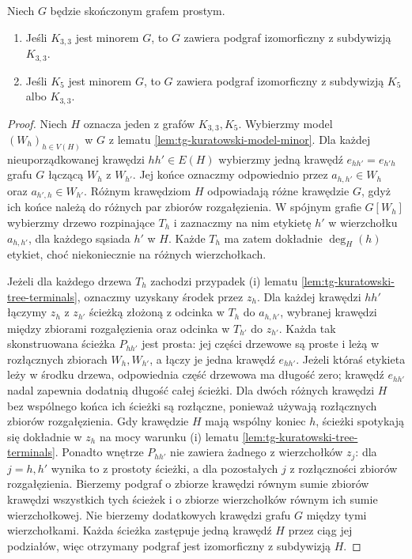 \begin{lemat}
\label{lem:tg-kuratowski-minor-to-subdivision}
Niech $G$ będzie skończonym grafem prostym.
\begin{enumerate}[label=(\roman*)]
\item Jeśli $K_{3,3}$ jest minorem $G$,
to $G$ zawiera podgraf izomorficzny
z subdywizją $K_{3,3}$.
\item Jeśli $K_5$ jest minorem $G$,
to $G$ zawiera podgraf izomorficzny
z subdywizją $K_5$ albo $K_{3,3}$.
\end{enumerate}
\end{lemat}
\begin{proof}
Niech $H$ oznacza jeden z grafów
$K_{3,3},K_5$. Wybierzmy model
$(W_h)_{h\in V(H)}$ w $G$
z lematu \ref{lem:tg-kuratowski-model-minor}.
Dla każdej nieuporządkowanej krawędzi $hh'\in E(H)$
wybierzmy jedną krawędź $e_{hh'}=e_{h'h}$ grafu $G$
łączącą $W_h$ z $W_{h'}$. Jej końce oznaczmy
odpowiednio przez $a_{h,h'}\in W_h$ oraz
$a_{h',h}\in W_{h'}$. Różnym krawędziom $H$
odpowiadają różne krawędzie $G$, gdyż ich końce
należą do różnych par zbiorów rozgałęzienia.
W spójnym grafie $G[W_h]$
wybierzmy drzewo rozpinające $T_h$
i zaznaczmy na nim etykietę $h'$
w wierzchołku $a_{h,h'}$,
dla każdego sąsiada $h'$ w $H$.
Każde $T_h$ ma zatem dokładnie
$\deg_H(h)$ etykiet, choć
niekoniecznie na różnych
wierzchołkach.

Jeżeli dla każdego drzewa $T_h$
zachodzi przypadek (i) lematu
\ref{lem:tg-kuratowski-tree-terminals},
oznaczmy uzyskany środek
przez $z_h$. Dla każdej
krawędzi $hh'$ łączymy
$z_h$ z $z_{h'}$ ścieżką
złożoną z odcinka w $T_h$
do $a_{h,h'}$, wybranej
krawędzi między zbiorami
rozgałęzienia oraz odcinka
w $T_{h'}$ do $z_{h'}$.
Każda tak skonstruowana ścieżka $P_{hh'}$ jest
prosta: jej części drzewowe są proste i leżą
w rozłącznych zbiorach $W_h,W_{h'}$, a łączy je
jedna krawędź $e_{hh'}$. Jeżeli któraś etykieta
leży w środku drzewa, odpowiednia część drzewowa
ma długość zero; krawędź $e_{hh'}$ nadal zapewnia
dodatnią długość całej ścieżki.
Dla dwóch różnych krawędzi $H$ bez wspólnego końca
ich ścieżki są rozłączne, ponieważ używają
rozłącznych zbiorów rozgałęzienia. Gdy krawędzie
$H$ mają wspólny koniec $h$, ścieżki spotykają się
dokładnie w $z_h$ na mocy warunku (i) lematu
\ref{lem:tg-kuratowski-tree-terminals}.
Ponadto wnętrze $P_{hh'}$ nie zawiera żadnego
z wierzchołków $z_j$: dla $j=h,h'$ wynika to
z prostoty ścieżki, a dla pozostałych $j$
z rozłączności zbiorów rozgałęzienia.
Bierzemy podgraf o zbiorze krawędzi równym sumie
zbiorów krawędzi wszystkich tych ścieżek i o zbiorze
wierzchołków równym ich sumie wierzchołkowej.
Nie bierzemy dodatkowych krawędzi grafu $G$
między tymi wierzchołkami. Każda ścieżka zastępuje
jedną krawędź $H$ przez ciąg jej podziałów, więc
otrzymany podgraf jest izomorficzny z subdywizją $H$.


\end{proof}
